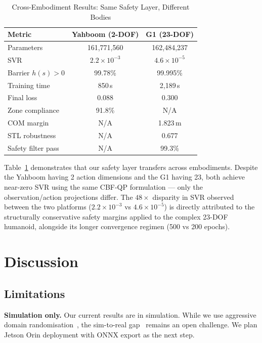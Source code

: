 \documentclass[10pt,twocolumn]{article}
\begin{document}
\begin{table}[h]
\centering
\caption{Cross-Embodiment Results: Same Safety Layer, Different Bodies}
\label{tab:cross}
\begin{tabular}{@{}lcc@{}}
\toprule
\textbf{Metric} & \textbf{Yahboom (2-DOF)} & \textbf{G1 (23-DOF)} \\
\midrule
Parameters          & 161,771,560 & 162,484,237 \\
SVR                 & $2.2 \times 10^{-3}$ & $4.6 \times 10^{-5}$ \\
Barrier $h(s) > 0$  & 99.78\% & 99.995\% \\
Training time       & 850\,s & 2{,}189\,s \\
Final loss          & 0.088 & 0.300 \\
Zone compliance     & 91.8\% & N/A \\
COM margin          & N/A & 1.823\,m \\
STL robustness      & N/A & 0.677 \\
Safety filter pass  & N/A & 99.3\% \\
\bottomrule
\end{tabular}
\end{table}

Table~\ref{tab:cross} demonstrates that our safety layer transfers across embodiments.
Despite the Yahboom having 2 action dimensions and the G1 having 23, both achieve near-zero SVR using the same CBF-QP formulation --- only the observation/action projections differ. The $48\times$ disparity in SVR observed between the two platforms ($2.2 \times 10^{-3}$ vs $4.6 \times 10^{-5}$) is directly attributed to the structurally conservative safety margins applied to the complex 23-DOF humanoid, alongside its longer convergence regimen (500 vs 200 epochs).

\section{Discussion}
\label{sec:discussion}

\subsection{Limitations}
\textbf{Simulation only.}
Our current results are in simulation. While we use aggressive domain randomisation~\cite{tobin2017domainrand}, the sim-to-real gap~\cite{hofer2021simtoreal} remains an open challenge. We plan Jetson Orin deployment with ONNX export as the next step.
\end{document}
